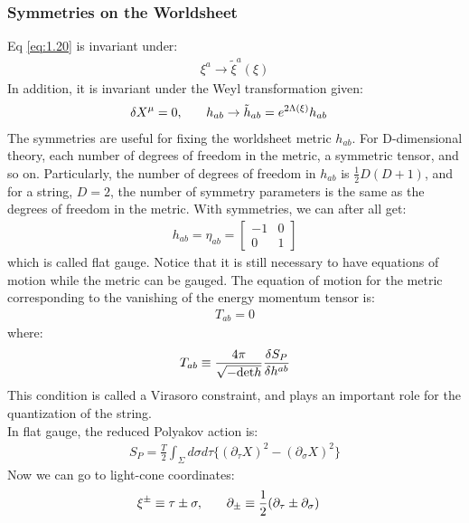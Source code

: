 \subsubsection{Symmetries on the Worldsheet}
Eq \ref{eq:1.20} is invariant under:
\begin{align}
    \xi ^{a} \rightarrow \tilde{\xi} ^{a} (\xi)
\end{align}
In addition, it is invariant under the Weyl transformation given:
\begin{align}
    \delta X^{\mu} = 0, & \qq{} h_{ab} \rightarrow \tilde{h}_{ab} = e^{2\Lambda (\xi)} h_{ab}
\end{align}
The symmetries are useful for fixing the worldsheet metric $h_{ab}$. For D-dimensional theory, each number of degrees of freedom in the metric, a symmetric tensor, and so on. Particularly, the number of degrees of freedom in $h_{ab}$ is $\frac{1}{2}D(D+1)$, and for a string, $D=2$, the number of symmetry parameters is the same as the degrees of freedom in the metric. With symmetries, we can after all get:
\begin{align}
    h_{ab} = \eta _{ab} = 
    \begin{bmatrix}
        -1 & 0 \\
        0 & 1
    \end{bmatrix}
\end{align}
which is called flat gauge. Notice that it is still necessary to have equations of motion while the metric can be gauged. The equation of motion for the metric corresponding to the vanishing of the energy momentum tensor is:
\begin{align}
    T_{ab} =0
\end{align}
where:
\begin{align}
    T_{ab} \equiv \frac{4\pi}{\sqrt{-\text{det} h}} \fdv{S_{P}}{h^{ab}}
\end{align}
This condition is called a Virasoro constraint, and plays an important role for the quantization of the string. \\
\indent In flat gauge, the reduced Polyakov action is:
\begin{align}
    S_{P} = \frac{T}{2} \int _{\Sigma} d\sigma d\tau \lbrace (\partial _{\tau} X)^{2} - (\partial _{\sigma} X)^{2}  \rbrace
\end{align}
Now we can go to light-cone coordinates:
\begin{align}
    \xi ^{\pm} \equiv \tau \pm \sigma, & \qq{} \partial _{\pm} \equiv \frac{1}{2} (\partial _{\tau} \pm \partial _{\sigma})
\end{align}
